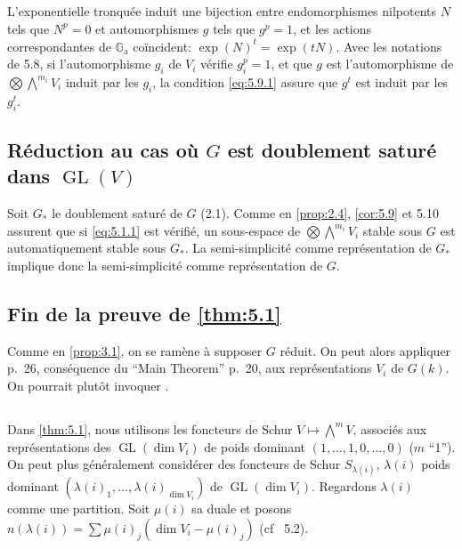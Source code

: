 \documentclass[11pt,a4paper]{article}
\theoremstyle{plain}
\theoremstyle{definition}
\DeclareMathOperator{\GL}{GL}
\newcommand{\Ga}{\mathbb{G}_\mathrm{a}}
\begin{document}
\subsection{}
L'exponentielle tronqu\'ee induit une bijection entre endomorphismes nilpotents $N$ tels que $N^p = 0$ et automorphismes $g$ tels que $g^p = 1$, et les actions correspondantes de $\Ga$ co\"incident: $\exp(N)^t = \exp(tN)$. Avec les notations de 5.8, si l'automorphisme $g_i$ de $V_i$ v\'erifie $g_i^p = 1$, et que $g$ est l'automorphisme de $\bigotimes \bigwedge^{m_i} V_i$ induit par les $g_i$, la condition \eqref{eq:5.9.1} assure que $g^t$ est induit par les $g_i^t$.

\subsection{R\'eduction au cas o\`u $G$ est doublement satur\'e dans $\GL(V)$}\label{sec:5.11}

Soit $G_*$ le doublement satur\'e de $G$ (2.1). Comme en \ref{prop:2.4}, \ref{cor:5.9} et 5.10 assurent que si \eqref{eq:5.1.1} est v\'erifi\'e, un sous-espace de $\bigotimes \bigwedge^{m_i} V_i$ stable sous $G$ est automatiquement stable sous $G_*$. La semi-simplicit\'e comme repr\'esentation de $G_*$ implique donc la semi-simplicit\'e comme repr\'esentation de $G$.

\subsection{Fin de la preuve de \ref{thm:5.1}}\label{sec:5.12}

Comme en \ref{prop:3.1}, on se ram\`ene \`a supposer $G$ r\'eduit. On peut alors appliquer \cite{Serre2003} p.~26, cons\'equence du ``Main Theorem'' p.~20, aux repr\'esentations $V_i$ de $G(k)$. On pourrait plut\^ot invoquer \cite{SerreBourbaki}.

\subsection{}
Dans \ref{thm:5.1}, nous utilisons les foncteurs de Schur $V \mapsto \bigwedge^m V$, associ\'es aux repr\'esentations des $\GL(\dim V_i)$ de poids dominant $(1, \ldots, 1, 0, \ldots, 0)$ ($m$ ``1''). On peut plus g\'en\'eralement consid\'erer des foncteurs de Schur $S_{\lambda(i)}$, $\lambda(i)$ poids dominant $(\lambda(i)_1, \ldots, \lambda(i)_{\dim V_i})$ de $\GL(\dim V_i)$. Regardons $\lambda(i)$ comme une partition. Soit $\mu(i)$ sa duale et posons $n(\lambda(i)) = \sum \mu(i)_j (\dim V_i - \mu(i)_j)$ (cf \cite{SerreBourbaki}~5.2).
\end{document}
